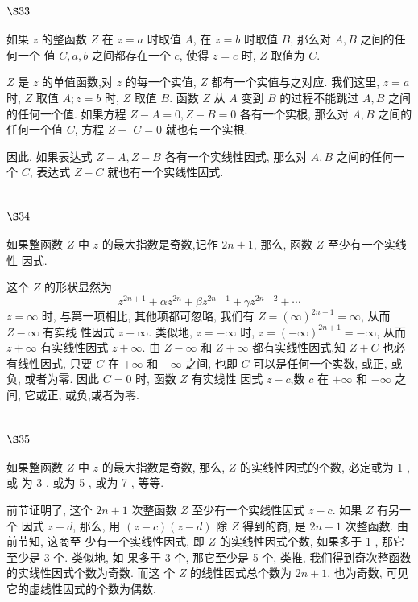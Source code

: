 \section{$\S 33$}

如果 $z$ 的整函数 $Z$ 在 $z=a$ 时取值 $A$, 在 $z=b$ 时取值 $B$, 那么对 $A, B$ 之间的任何一个 值 $C, a, b$ 之间都存在一个 $c$, 使得 $z=c$ 时, $Z$ 取值为 $C$.

$Z$ 是 $z$ 的单值函数,对 $z$ 的每一个实值, $Z$ 都有一个实值与之对应. 我们这里, $z=a$ 时, $Z$ 取值 $A ; z=b$ 时, $Z$ 取值 $B$. 函数 $Z$ 从 $A$ 变到 $B$ 的过程不能跳过 $A, B$ 之间的任何一个值. 如果方程 $Z-A=0, Z-B=0$ 各有一个实根, 那么对 $A, B$ 之间的任何一个值 $C$, 方程 $Z-$ $C=0$ 就也有一个实根.

因此, 如果表达式 $Z-A, Z-B$ 各有一个实线性因式, 那么对 $A, B$ 之间的任何一个 $C$, 表达式 $Z-C$ 就也有一个实线性因式.

\section{$\S 34$}

如果整函数 $Z$ 中 $z$ 的最大指数是奇数,记作 $2 n+1$, 那么, 函数 $Z$ 至少有一个实线性 因式.

这个 $Z$ 的形状显然为
\[
z^{2 n+1}+\alpha z^{2 n}+\beta z^{2 n-1}+\gamma z^{2 n-2}+\cdots
\]
$z=\infty$ 时, 与第一项相比, 其他项都可忽略, 我们有 $Z=(\infty)^{2 n+1}=\infty$, 从而 $Z-\infty$ 有实线 性因式 $z-\infty$. 类似地, $z=-\infty$ 时, $z=(-\infty)^{2 n+1}=-\infty$, 从而 $z+\infty$ 有实线性因式 $z+\infty$. 由 $Z-\infty$ 和 $Z+\infty$ 都有实线性因式,知 $Z+C$ 也必有线性因式, 只要 $C$ 在 $+\infty$ 和 $-\infty$ 之间, 也即 $C$ 可以是任何一个实数, 或正, 或负, 或者为零. 因此 $C=0$ 时, 函数 $Z$ 有实线性 因式 $z-c$,数 $c$ 在 $+\infty$ 和 $-\infty$ 之间, 它或正, 或负,或者为零.

\section{$\S 35$}

如果整函数 $Z$ 中 $z$ 的最大指数是奇数, 那么, $Z$ 的实线性因式的个数, 必定或为 1 , 或 为 3 , 或为 5 , 或为 7 , 等等. 

前节证明了, 这个 $2 n+1$ 次整函数 $Z$ 至少有一个实线性因式 $z-c$. 如果 $Z$ 有另一个 因式 $z-d$, 那么, 用 $(z-c)(z-d)$ 除 $Z$ 得到的商, 是 $2 n-1$ 次整函数. 由前节知, 这商至 少有一个实线性因式, 即 $Z$ 的实线性因式个数, 如果多于 1 , 那它至少是 3 个. 类似地, 如 果多于 3 个, 那它至少是 5 个, 类推, 我们得到奇次整函数的实线性因式个数为奇数. 而这 个 $Z$ 的线性因式总个数为 $2 n+1$, 也为奇数, 可见它的虚线性因式的个数为偶数.

